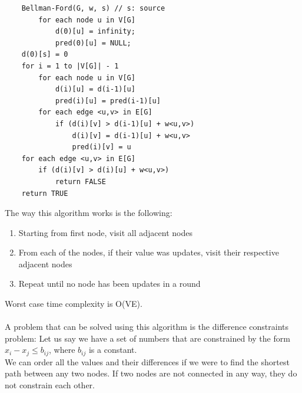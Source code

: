 \documentclass[nobib]{tufte-handout}
\begin{document}
\begin{lstlisting}
    Bellman-Ford(G, w, s) // s: source
        for each node u in V[G]
            d(0)[u] = infinity; 
            pred(0)[u] = NULL;
    d(0)[s] = 0
    for i = 1 to |V[G]| - 1
        for each node u in V[G]
            d(i)[u] = d(i-1)[u]
            pred(i)[u] = pred(i-1)[u]
        for each edge <u,v> in E[G]
            if (d(i)[v] > d(i-1)[u] + w<u,v>)
                d(i)[v] = d(i-1)[u] + w<u,v>
                pred(i)[v] = u
    for each edge <u,v> in E[G]
        if (d(i)[v] > d(i)[u] + w<u,v>)
            return FALSE
    return TRUE
\end{lstlisting}
The way this algorithm works is the following:
\begin{enumerate}
    \item Starting from first node, visit all adjacent nodes
    \item From each of the nodes, if their value was updates, visit their respective
          adjacent nodes
    \item Repeat until no node has been updates in a round
\end{enumerate}
Worst case time complexity is O(VE).\\~\\
A problem that can be solved using this algorithm is the difference constraints problem:
Let us say we have a set of numbers that are constrained by the form $x_i-x_j \leq b_{ij}$, where $b_{ij}$ is a constant.\\
We can order all the values and their differences if we were to find the shortest path between any two nodes. If two nodes are not connected in any way, they do not constrain each other.\\
\end{document}
